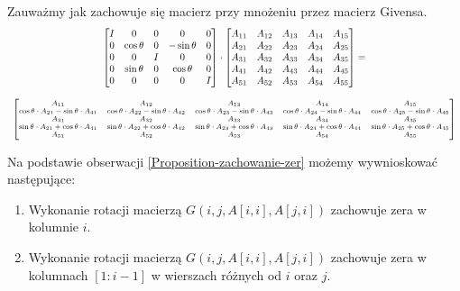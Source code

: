 \documentclass[12pt,a4paper]{report}
\newcommand{\mx}[1]{{#1}}
\begin{document}
\begin{proposition} \label{Proposition-zachowanie-zer}
Zauważmy jak zachowuje się macierz przy mnożeniu przez macierz Givensa.
{
\begin{equation*}
\begin{array}{c}
\begin{bmatrix}
I & 0 & 0 & 0 & 0 \\
0 & \cos\theta & 0 & -\sin\theta & 0 \\
0 & 0 & I & 0 & 0 \\
0 & \sin\theta & 0 & \cos\theta & 0 \\
0 & 0 & 0 & 0 & I
\end{bmatrix} \cdot \begin{bmatrix}
A_{11} & A_{12} & A_{13} & A_{14} & A_{15} \\
A_{21} & A_{22} & A_{23} & A_{24} & A_{25} \\
A_{31} & A_{32} & A_{33} & A_{34} & A_{35} \\
A_{41} & A_{42} & A_{43} & A_{44} & A_{45} \\
A_{51} & A_{52} & A_{53} & A_{54} & A_{55}
\end{bmatrix} = \\ \\
{\scriptsize
\begin{bmatrix}
A_{11} & A_{12} & A_{13} & A_{14} & A_{15} \\
\cos\theta \cdot A_{21} - \sin\theta\cdot A_{41} & \cos\theta \cdot A_{22}- \sin\theta\cdot A_{42} & \cos\theta \cdot A_{23}- \sin\theta\cdot A_{43} & \cos\theta \cdot A_{24}- \sin\theta\cdot A_{44} & \cos\theta \cdot A_{25}- \sin\theta\cdot A_{45} \\
A_{31} & A_{32} & A_{33} & A_{34} & A_{35} \\
\sin\theta\cdot A_{21} + \cos\theta\cdot A_{41} & \sin\theta\cdot A_{22} + \cos\theta\cdot A_{42} & \sin\theta\cdot A_{23} + \cos\theta\cdot A_{43} & \sin\theta\cdot A_{24} + \cos\theta\cdot A_{44} & \sin\theta\cdot A_{25} + \cos\theta\cdot A_{45} \\
A_{51} & A_{52} & A_{53} & A_{54} & A_{55} 
\end{bmatrix}
}
\end{array}
\end{equation*}
}
\end{proposition}

\begin{proposition}\label{Proposition-zera-w-kolumnie}
Na podstawie obserwacji \ref{Proposition-zachowanie-zer} możemy wywnioskować następujące:
\begin{enumerate}
\item Wykonanie rotacji macierzą $\mx{G}(i,j, \mx{A}[i,i], \mx{A}[j,i])$ zachowuje zera w kolumnie $i$.
\item Wykonanie rotacji macierzą $\mx{G}(i,j, \mx{A}[i,i], \mx{A}[j,i])$ zachowuje zera w kolumnach $[1:i-1]$ w wierszach różnych od $i$ oraz $j$.
\end{enumerate}
\end{proposition}
\end{document}
